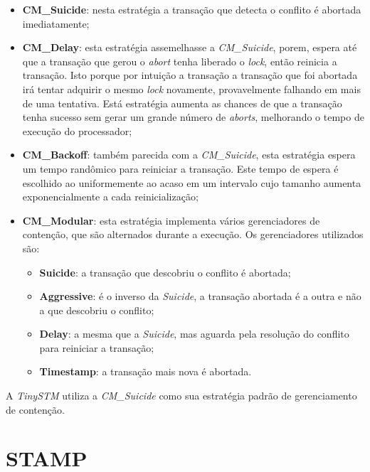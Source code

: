 \documentclass[diss,capa]{texufpel}
\begin{document}
\begin{itemize}
 \item \textbf{CM\_Suicide}: nesta estratégia a transação que detecta o conflito é abortada imediatamente;

 \item \textbf{CM\_Delay}: esta estratégia assemelhasse a \emph{CM\_Suicide}, porem, espera até que a transação que gerou o \emph{abort} tenha liberado o \emph{lock}, então reinicia a transação. Isto porque por intuição a transação a transação que foi abortada irá tentar adquirir o mesmo \emph{lock} novamente, provavelmente falhando em mais de uma tentativa. Está estratégia aumenta as chances de que a transação tenha sucesso sem gerar um grande número de \emph{aborts}, melhorando o tempo de execução do processador;

 \item \textbf{CM\_Backoff}: também parecida com a \emph{CM\_Suicide}, esta estratégia espera um tempo randômico para reiniciar a transação. Este tempo de espera é escolhido ao uniformemente ao acaso em um intervalo cujo tamanho aumenta exponencialmente a cada reinicialização;

 \item \textbf{CM\_Modular}: esta estratégia implementa vários gerenciadores de contenção, que são alternados durante a execução. Os gerenciadores utilizados são:

    \begin{itemize}
       \item \textbf{Suicide}: a transação que descobriu o conflito é abortada;

       \item \textbf{Aggressive}: é o inverso da \emph{Suicide}, a transação abortada é a outra e não a que descobriu o conflito;

       \item \textbf{Delay}: a mesma que a \emph{Suicide}, mas aguarda pela resolução do conflito para reiniciar a transação;

       \item \textbf{Timestamp}: a transação mais nova é abortada.
    \end{itemize}

\end{itemize}

A \emph{TinySTM} utiliza a \emph{CM\_Suicide} como sua estratégia padrão de gerenciamento de contenção.

\section{STAMP}
\end{document}
